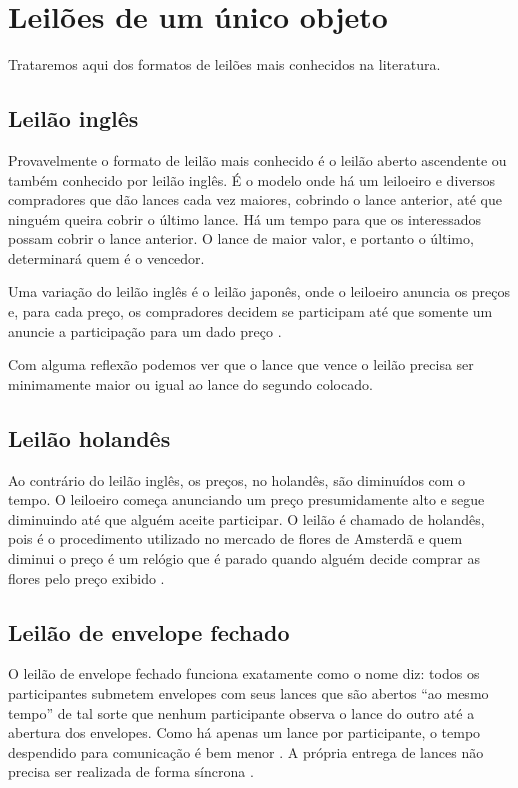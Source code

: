 \section{Leilões de um único objeto}

Trataremos aqui dos formatos de leilões mais conhecidos na literatura.

\subsection{Leilão inglês}

Provavelmente o formato de leilão mais conhecido é o leilão aberto ascendente ou também conhecido por leilão inglês. É o modelo onde há um leiloeiro e diversos compradores que dão lances cada vez maiores, cobrindo o lance anterior, até que ninguém queira cobrir o último lance. Há um tempo para que os interessados possam cobrir o lance anterior. O lance de maior valor, e portanto o último, determinará quem é o vencedor.

Uma variação do leilão inglês é o leilão japonês, onde o leiloeiro anuncia os preços e, para cada preço, os compradores decidem se participam até que somente um anuncie a participação para um dado preço \citet{Shoham2008}.

Com alguma reflexão podemos ver que o lance que vence o leilão precisa ser minimamente maior ou igual ao lance do segundo colocado.

\subsection{Leilão holandês}

Ao contrário do leilão inglês, os preços, no holandês, são diminuídos com o tempo. O leiloeiro começa anunciando um preço presumidamente alto e segue diminuindo até que alguém aceite participar. O leilão é chamado de holandês, pois é o procedimento utilizado no mercado de flores de Amsterdã e quem diminui o preço é um relógio que é parado quando alguém decide comprar as flores pelo preço exibido \citet{Shoham2008}.

\subsection{Leilão de envelope fechado}

O leilão de envelope fechado funciona exatamente como o nome diz: todos os participantes submetem envelopes com seus lances que são abertos ``ao mesmo tempo'' de tal sorte que nenhum participante observa o lance do outro até a abertura dos envelopes. Como há apenas um lance por participante, o tempo despendido para comunicação é bem menor \citet{karlin2017game}. A própria entrega de lances não precisa ser realizada de forma síncrona \citet{krishna}.

